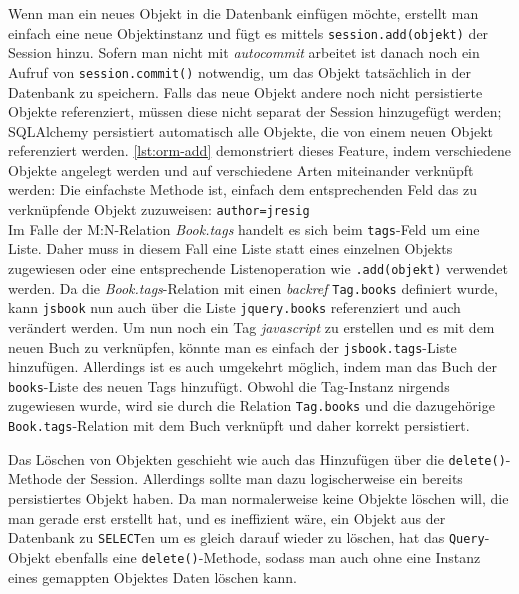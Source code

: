 Wenn man ein neues Objekt in die Datenbank einfügen möchte, erstellt man einfach
eine neue Objektinstanz und fügt es mittels \texttt{session.add(objekt)} der
Session hinzu. Sofern man nicht mit \emph{autocommit} arbeitet ist danach noch
ein Aufruf von \texttt{session.commit()} notwendig, um das Objekt tatsächlich in
der Datenbank zu speichern. Falls das neue Objekt andere noch nicht persistierte
Objekte referenziert, müssen diese nicht separat der Session hinzugefügt werden;
SQLAlchemy persistiert automatisch alle Objekte, die von einem neuen Objekt
referenziert werden. \autoref{lst:orm-add} demonstriert dieses Feature, indem
verschiedene Objekte angelegt werden und auf verschiedene Arten miteinander
verknüpft werden:
Die einfachste Methode ist, einfach dem entsprechenden Feld das zu verknüpfende
Objekt zuzuweisen: \texttt{author=jresig} \\
Im Falle der M:N-Relation \emph{Book.tags} handelt es sich beim
\texttt{tags}-Feld um eine Liste. Daher muss in diesem Fall eine Liste statt
eines einzelnen Objekts zugewiesen oder eine entsprechende Listenoperation
wie \texttt{.add(objekt)} verwendet werden. Da die \emph{Book.tags}-Relation
mit einen \textit{backref} \texttt{Tag.books} definiert wurde, kann
\texttt{jsbook} nun auch über die Liste \texttt{jquery.books} referenziert und
auch verändert werden. Um nun noch ein Tag \emph{javascript} zu erstellen und es
mit dem neuen Buch zu verknüpfen, könnte man es einfach der
\texttt{jsbook.tags}-Liste hinzufügen. Allerdings ist es auch umgekehrt möglich,
indem man das Buch der \texttt{books}-Liste des neuen Tags hinzufügt. Obwohl die
Tag-Instanz nirgends zugewiesen wurde, wird sie durch die Relation
\texttt{Tag.books} und die dazugehörige \texttt{Book.tags}-Relation mit dem Buch
verknüpft und daher korrekt persistiert.



Das Löschen von Objekten geschieht wie auch das Hinzufügen über die
\texttt{delete()}-Methode der Session. Allerdings sollte man dazu logischerweise ein
bereits persistiertes Objekt haben. Da man normalerweise keine Objekte löschen
will, die man gerade erst erstellt hat, und es ineffizient wäre, ein Objekt aus
der Datenbank zu \texttt{SELECT}en um es gleich darauf wieder zu löschen, hat das
\texttt{Query}-Objekt ebenfalls eine \texttt{delete()}-Methode, sodass man auch
ohne eine Instanz eines gemappten Objektes Daten löschen kann.


